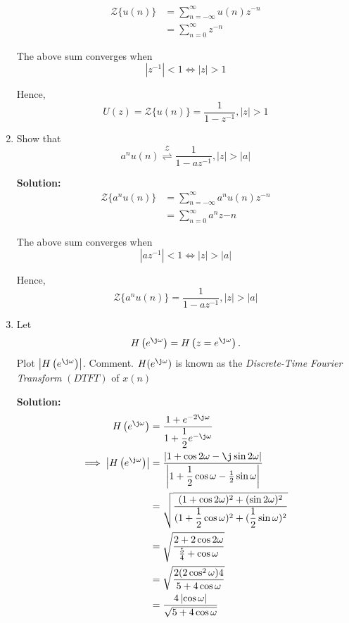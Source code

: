 \documentclass[journal,12pt,twocolumn]{IEEEtran}
\newcommand{\solution}{\noindent \textbf{Solution: }}
\providecommand{\brak}[1]{\ensuremath{\left(#1\right)}}
\providecommand{\abs}[1]{\left\vert#1\right\vert}
\providecommand{\z}[1]{{\mathcal{Z}}\{#1\}}
\providecommand{\ztrans}{\overset{\mathcal{Z}}{ \rightleftharpoons}}
\numberwithin{equation}{section}
\renewcommand\thesection{\arabic{section}}
\begin{document}
\begin{enumerate}[label=\thesection.\arabic*]
	\begin{align}
		\z{u(n)} &= \sum _{n=-\infty }^{\infty } u(n)z^{-n} \\
		&= \sum _{n=0}^{\infty }z^{-n} 
	\end{align}
	
	The above sum converges when
	\begin{equation}
		\abs{z^{-1}} < 1 \iff \abs{z} > 1
	\end{equation}
	
	Hence,
	\begin{equation}
		U(z) = \z{u(n)} = \frac{1}{1 - z^{-1}}, \abs{z} > 1
	\end{equation}
	
	\item Show that 
	\begin{equation}
		\label{eq:anun}
		a^{n}u\brak{n} \ztrans \frac{1}{1-az^{-1}}, \abs{z} > \abs{a}
	\end{equation}
	
	\solution
	\begin{align}
		\z{a^{n}u\brak{n}} &= \sum _{n=-\infty }^{\infty } a^{n}u\brak{n}z^{-n} \\
		&= \sum _{n=0}^{\infty } a^{n}z{-n} 
	\end{align}
	
	The above sum converges when
	\begin{equation}
		\abs{az^{-1}} < 1 \iff \abs{z} > \abs{a}
	\end{equation}
	
	Hence,
	\begin{equation}
		\z{a^nu\brak{n}} = \frac{1}{1-az^{-1}}, \abs{z} > \abs{a}
	\end{equation}
	
	\item Let
	\begin{equation}
		H\brak{e^{\j\omega}} = H\brak{z = e^{\j\omega}}.
	\end{equation}
	Plot $\abs{H\brak{e^{\j\omega}}}$.  Comment.  $H(e^{\j\omega})$ is known as the {\em Discrete-Time Fourier Transform} \brak{DTFT} of $x(n)$
	
	\solution
	\begin{align}
		H\brak{e^{\j\omega}} &= \frac{1 + e^{-2\j\omega}}{1 + \dfrac{1}{2}e^{-\j\omega}} \\
		\implies \abs{H\brak{e^{\j\omega}}} &= \frac{\abs{1 + \cos2\omega - \j\sin2\omega}}{\abs{1 + \dfrac{1}{2} \cos\omega - \frac12 \sin\omega}} \\
		&= \sqrt{\frac{(1 + \cos2\omega)^2 + (\sin2\omega)^2}{(1 + \dfrac{1}{2} \cos\omega)^2 + (\dfrac{1}{2}\sin\omega)^2}}\\
		&= \sqrt{\frac{2 + 2\cos2\omega}{\frac54 + \cos\omega}} \\
		&= \sqrt{\frac{2(2\cos^2\omega)4}{5 + 4\cos\omega} } \\
		&= \frac{4\abs{\cos\omega}}{\sqrt{5 + 4\cos\omega}}
	\end{align}
	

\end{enumerate}
\end{document}
